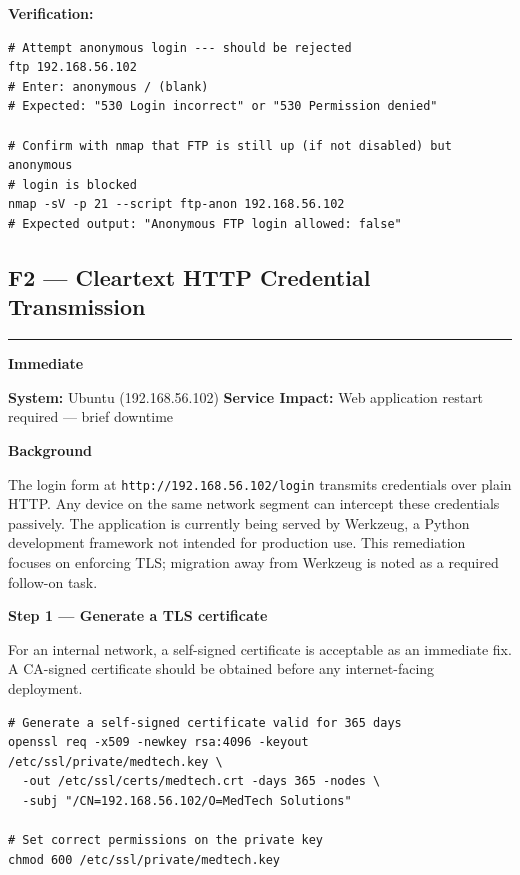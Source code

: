 \documentclass[12pt]{article}
\newcommand{\tfbadge}[2]{%
  \colorbox{#1}{\color{white}\textbf{\small #2}}%
}
\newcommand{\sectionrule}{%
  \vspace{4pt}\noindent\textcolor{headercol}{\rule{\linewidth}{0.8pt}}\vspace{4pt}%
}
\begin{document}
\bigskip
 
\begin{verifybox}
\textbf{Verification:}
\begin{lstlisting}[style=terminal]
# Attempt anonymous login --- should be rejected
ftp 192.168.56.102
# Enter: anonymous / (blank)
# Expected: "530 Login incorrect" or "530 Permission denied"
 
# Confirm with nmap that FTP is still up (if not disabled) but anonymous
# login is blocked
nmap -sV -p 21 --script ftp-anon 192.168.56.102
# Expected output: "Anonymous FTP login allowed: false"
\end{lstlisting}
\end{verifybox}
 
\subsection{F2 --- Cleartext HTTP Credential Transmission}
\sectionrule
 
\noindent\tfbadge{immediatecol}{Immediate}
\quad\textbf{System:} Ubuntu (192.168.56.102)
\quad\textbf{Service Impact:} Web application restart required --- brief
downtime
 
\bigskip
\noindent\textbf{Background}
 
The login form at \texttt{http://192.168.56.102/login} transmits credentials
over plain HTTP. Any device on the same network segment can intercept these
credentials passively. The application is currently being served by Werkzeug,
a Python development framework not intended for production use. This
remediation focuses on enforcing TLS; migration away from Werkzeug is noted
as a required follow-on task.
 
\bigskip
\noindent\textbf{Step 1 --- Generate a TLS certificate}
 
For an internal network, a self-signed certificate is acceptable as an
immediate fix. A CA-signed certificate should be obtained before any
internet-facing deployment.
 
\begin{lstlisting}[style=terminal]
# Generate a self-signed certificate valid for 365 days
openssl req -x509 -newkey rsa:4096 -keyout /etc/ssl/private/medtech.key \
  -out /etc/ssl/certs/medtech.crt -days 365 -nodes \
  -subj "/CN=192.168.56.102/O=MedTech Solutions"
 
# Set correct permissions on the private key
chmod 600 /etc/ssl/private/medtech.key
\end{lstlisting}
 
\end{document}
